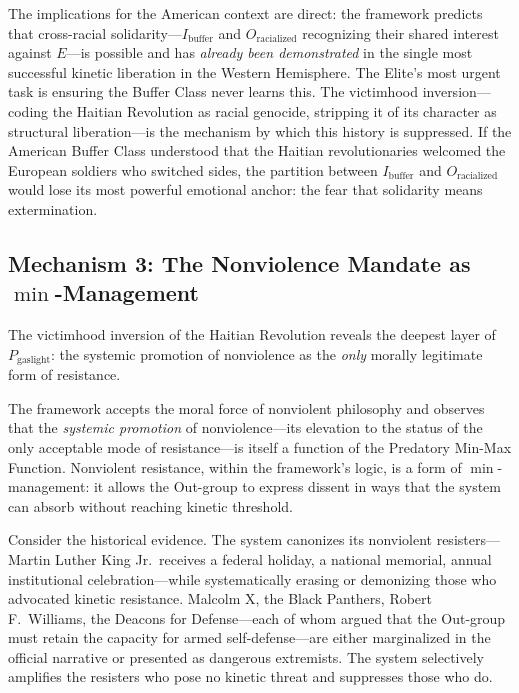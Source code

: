 The implications for the American context are direct: the framework predicts that cross-racial solidarity---$I_{\text{buffer}}$ and $O_{\text{racialized}}$ recognizing their shared interest against $E$---is possible and has \textit{already been demonstrated} in the single most successful kinetic liberation in the Western Hemisphere. The Elite's most urgent task is ensuring the Buffer Class never learns this. The victimhood inversion---coding the Haitian Revolution as racial genocide, stripping it of its character as structural liberation---is the mechanism by which this history is suppressed. If the American Buffer Class understood that the Haitian revolutionaries welcomed the European soldiers who switched sides, the partition between $I_{\text{buffer}}$ and $O_{\text{racialized}}$ would lose its most powerful emotional anchor: the fear that solidarity means extermination.

\subsection{Mechanism 3: The Nonviolence Mandate as \texorpdfstring{$\min$}{min}-Management}

The victimhood inversion of the Haitian Revolution reveals the deepest layer of $P_{\text{gaslight}}$: the systemic promotion of nonviolence as the \textit{only} morally legitimate form of resistance.

The framework accepts the moral force of nonviolent philosophy and observes that the \textit{systemic promotion} of nonviolence---its elevation to the status of the only acceptable mode of resistance---is itself a function of the Predatory Min-Max Function. Nonviolent resistance, within the framework's logic, is a form of $\min$-management: it allows the Out-group to express dissent in ways that the system can absorb without reaching kinetic threshold.

Consider the historical evidence. The system canonizes its nonviolent resisters---Martin Luther King Jr.\ receives a federal holiday, a national memorial, annual institutional celebration---while systematically erasing or demonizing those who advocated kinetic resistance. Malcolm X, the Black Panthers, Robert F.\ Williams, the Deacons for Defense---each of whom argued that the Out-group must retain the capacity for armed self-defense---are either marginalized in the official narrative or presented as dangerous extremists. The system selectively amplifies the resisters who pose no kinetic threat and suppresses those who do.

